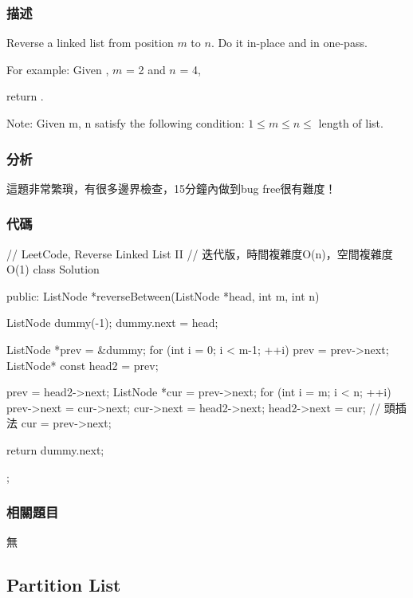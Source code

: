 \subsubsection{描述}
Reverse a linked list from position $m$ to $n$. Do it in-place and in one-pass.

For example:
Given , $m$ = 2 and $n$ = 4,

return .

Note:
Given m, n satisfy the following condition:
$1 \leq m \leq  n \leq $ length of list.


\subsubsection{分析}
這題非常繁瑣，有很多邊界檢查，15分鐘內做到bug free很有難度！


\subsubsection{代碼}
\begin{Code}
// LeetCode, Reverse Linked List II
// 迭代版，時間複雜度O(n)，空間複雜度O(1)
class Solution {
public:
    ListNode *reverseBetween(ListNode *head, int m, int n) {
        ListNode dummy(-1);
        dummy.next = head;

        ListNode *prev = &dummy;
        for (int i = 0; i < m-1; ++i)
            prev = prev->next;
        ListNode* const head2 = prev;

        prev = head2->next;
        ListNode *cur = prev->next;
        for (int i = m; i < n; ++i) {
            prev->next = cur->next;
            cur->next = head2->next;
            head2->next = cur;  // 頭插法
            cur = prev->next;
        }

        return dummy.next;
    }
};
\end{Code}


\subsubsection{相關題目}

\begindot
\item 無
\myenddot


\subsection{Partition List}
\label{sec:partition-list}


